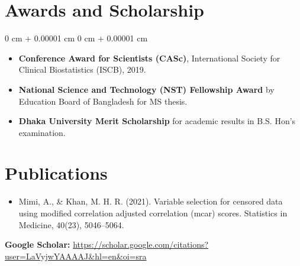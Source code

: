 \documentclass[10pt, letterpaper]{article}
\newenvironment{highlights}{
    \begin{itemize}[
        topsep=0.10 cm,
        parsep=0.10 cm,
        partopsep=0pt,
        itemsep=0pt,
        leftmargin=0 cm + 10pt
    ]
}{
    \end{itemize}
} %
\newenvironment{onecolentry}{
    \begin{adjustwidth}{
        0 cm + 0.00001 cm
    }{
        0 cm + 0.00001 cm
    }
}{
    \end{adjustwidth}
} %
\begin{document}
    \enlargethispage{2\baselineskip}
    \section{Awards and Scholarship}
        \begin{onecolentry}
            \begin{highlights}
                \item \textbf{Conference Award for Scientists (CASc)}, International Society for Clinical Biostatistics (ISCB), 2019.
                \item \textbf{National Science and Technology (NST) Fellowship Award} by Education Board of Bangladesh for MS thesis.
                \item \textbf{Dhaka University Merit Scholarship} for academic results in B.S. Hon’s examination.
            \end{highlights}
        \end{onecolentry}


    \section{Publications}
        
        \begin{samepage}
        \begin{itemize}
            \item Mimi, A., \& Khan, M. H. R. (2021). Variable selection for censored data using modified correlation adjusted correlation (mcar) scores. Statistics in Medicine, 40(23), 5046–5064.     
           

        \end{itemize}
        \textbf{Google Scholar:} \href{https://scholar.google.com/citations?user=LaVyjwYAAAAJ&hl=en&oi=sra}{https://scholar.google.com/citations?user=LaVyjwYAAAAJ\&hl=en\&oi=sra}
         \end{samepage}
\end{document}
